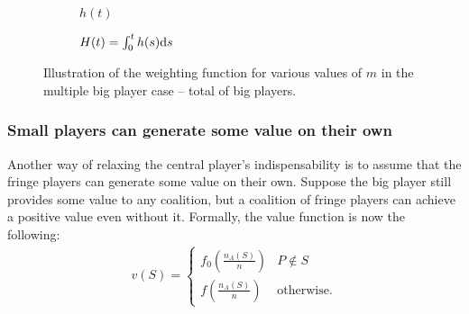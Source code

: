 \begin{figure}[ht]
    \centering
    \begin{subfigure}[b]{0.45\textwidth}
        \centering
        \caption{$h(t)$}
    \end{subfigure}
    \begin{subfigure}[b]{0.45\textwidth}
        \centering
        \caption{$H(t) = \int_0^t h(s) \mathrm{d}s$}
    \end{subfigure}
    \caption{Illustration of the weighting function for various values of $m$ in the multiple big player case -- total of big players.}
    \label{fig:multiple_platforms_total}
\end{figure}


\subsubsection{Small players can generate some value on their own}

Another way of relaxing the central player's indispensability is to assume that the fringe players can generate some value on their own.
Suppose the big player still provides some value to any coalition, but a coalition of fringe players can achieve a positive value even without it.
Formally, the value function is now the following:
\begin{align*}
    v(S) = \begin{cases}
        f_0\left(\frac{n_A(S)}{n}\right) & P \notin S \\
        f\left(\frac{n_A(S)}{n}\right)   & \text{otherwise}.
    \end{cases}
\end{align*}


